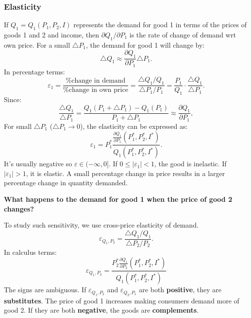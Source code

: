 \documentclass[10pt,a4paper]{book}
\theoremstyle{definition}\newtheorem{definition}{Definition}
\theoremstyle{definition}\newtheorem{fact}{Fact}
\theoremstyle{definition}\newtheorem{ex}{Ex.}
\theoremstyle{definition}\newtheorem{project}{Project}
\theoremstyle{definition}\newtheorem{problem}{Problem}
\theoremstyle{definition}\newtheorem{example}{Example}
\numberwithin{theorem}{chapter}
\numberwithin{corollary}{chapter}
\numberwithin{assumption}{chapter}
\numberwithin{definition}{chapter}
\numberwithin{prop}{chapter}
\numberwithin{notation}{chapter}
\numberwithin{problem}{chapter}
\numberwithin{example}{chapter}
\numberwithin{fact}{chapter}
\numberwithin{ex}{chapter}
\begin{document}
	\subsubsection{Elasticity}
	If $Q_1 = Q_1(P_1, P_2, I)$ represents the demand for good 1 in terms of the prices of goods 1 and 2 and income, then $\partial Q_1 /\partial P_1$ is the rate of change of demand wrt own price. For a small $\triangle P_1$, the demand for good 1 will change by:
	\begin{equation*}
		\triangle Q_1 \approx \frac{\partial Q_1}{\partial P_1} \triangle P_1.
	\end{equation*}
	In percentage terms:
	\begin{equation*}
		\varepsilon_1 = \frac{\% \text{change in demand}}{\% \text{change in own price}} = \frac{\triangle Q_1/Q_1}{\triangle P_1/P_1} = \frac{P_1}{Q_1} \cdot \frac{\triangle Q_1}{\triangle P_1}.
	\end{equation*}
	Since:
	\begin{equation*}
		\frac{\triangle Q_1}{\triangle P_1} = \frac{Q_1 (P_1 + \triangle P_1) - Q_1 (P_1)}{P_1 + \triangle P_1} \approx \frac{\partial Q_1}{\partial P_1},
	\end{equation*}
	For small $\triangle P_1$ ($\triangle P_1 \to 0$), the elasticity can be expressed as:
	\begin{equation*}
		\varepsilon_1 = P_1^* \frac{\frac{\partial Q_1}{\partial P_1} (P_1^*, P_2^*, I^*)}{Q_1 (P_1^*, P_2^*, I^*)}.
	\end{equation*}
	It's usually negative so $\varepsilon \in (-\infty, 0]$. If $0 \leq |\varepsilon_1| < 1$, the good is inelastic. If $|\varepsilon_1| > 1$, it is elastic. A small percentage change in price results in a larger percentage change in quantity demanded.
	
	\textbf{What happens to the demand for good 1 when the price of good 2 changes?}
	
	To study such sensitivity, we use cross-price elasticity of demand.
	\begin{equation*}
		\varepsilon_{Q_1, P_2} = \frac{\triangle Q_1/Q_1}{\triangle P_2/P_2}.
	\end{equation*}
	In calculus terms:
	\begin{equation*}
		\varepsilon_{Q_1,P_2} = \frac{P_2^* \frac{\partial Q_1}{\partial P_2}(P_1^*, P_2^*, I^*)}{Q_1(P_1^*, P_2^*, I^*)}
	\end{equation*}
	The signs are ambiguous. If $\varepsilon_{Q_1,P_2}$ and $\varepsilon_{Q_2,P_1}$ are both \textbf{positive}, they are \textbf{substitutes}. The price of good 1 increases making consumers demand more of good 2. If they are both \textbf{negative}, the goods are \textbf{complements}. 
	
\end{document}
